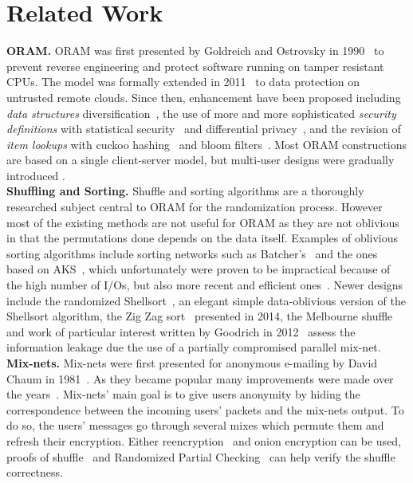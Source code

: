 \documentclass{llncs}
\begin{document}
\section{Related Work}\label{Related}
\noindent\textbf{ORAM.}
ORAM was first presented by Goldreich and Ostrovsky in 1990~\cite{ostrovsky1990efficient} to prevent reverse engineering and protect software running on tamper resistant CPUs. The model was formally extended in 2011~\cite{boneh2011} to data protection on untrusted remote clouds.
Since then, enhancement have been proposed including \textit{data structures} diversification~\cite{goldreich1996software,stefanov2011towards,stefanov2013path,ren2014ring},
the use of more and more sophisticated \textit{security definitions} with statistical security~\cite{damgaard2011perfectly,ajtai2010oblivious} and differential privacy~\cite{wagh2016root}, and the revision of \textit{item lookups} with cuckoo hashing~\cite{pinkas2010oblivious} and bloom filters~\cite{williams2008building}.
Most ORAM constructions are based on a single client-server model, but multi-user designs were gradually introduced \cite{backesanonymous,franz2011oblivious,goodrich2012privacy}.\\

\noindent\textbf{Shuffling and Sorting.}
Shuffle and sorting algorithms are a thoroughly researched subject central to ORAM for the randomization process. However most of the existing methods are not useful for ORAM as they are not oblivious in that the permutations done depends on the data itself.
Examples of oblivious sorting algorithms include sorting networks such as Batcher's~\cite{batcher1968sorting} and the ones based on AKS~\cite{ajtai19830}, which unfortunately were proven to be impractical because of the high number of I/Os, but also more recent and efficient ones~\cite{paterson1990improved}.
Newer designs include the randomized Shellsort~\cite{goodrich2010randomized}, an elegant simple data-oblivious version of the Shellsort algorithm, the Zig Zag sort~\cite{goodrich2014zig} presented in 2014, the Melbourne shuffle~\cite{ohrimenko2014melbourne} and work of particular interest written by Goodrich in 2012~\cite{goodrich2012anonymous} assess the information leakage due the use of a partially compromised parallel mix-net.\\

\noindent\textbf{Mix-nets.}
Mix-nets were first presented for anonymous e-mailing by David Chaum in 1981~\cite{chaum1981untraceable}. As they became popular many improvements were made over the years~\cite{moller2003mixmaster,danezis2003mixminion,danezis2004minx,danezis2009sphinx}. Mix-nets' main goal is to give users anonymity by hiding the correspondence between the incoming users' packets and the mix-nets output. To do so, the users' messages go through several mixes which permute them and refresh their encryption. Either reencryption~\cite{wikstrom2006adaptively} and onion encryption can be used, proofs of shuffle~\cite{groth2007verifiable,groth2007non,bayer2012efficient} and Randomized Partial Checking~\cite{jakobsson2002making} can help verify the shuffle correctness.
\end{document}

